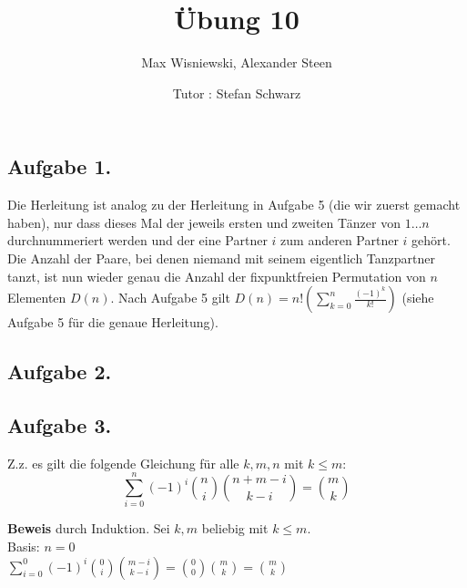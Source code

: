 \documentclass[11pt,a4paper,ngerman]{article}
\date{Tutor : Stefan Schwarz}
\title{Übung 10}
\author{Max Wisniewski, Alexander Steen}
\begin{document}

\renewcommand{\figurename}{Figure}

\maketitle
\thispagestyle{fancy}

\subsection*{Aufgabe 1.}
Die Herleitung ist analog zu der Herleitung in Aufgabe 5 (die wir zuerst gemacht haben), nur dass dieses Mal der jeweils ersten und zweiten Tänzer von $1 \ldots n$ durchnummeriert werden und der eine Partner $i$ zum anderen Partner $i$ gehört. Die Anzahl der Paare, bei denen niemand mit seinem eigentlich Tanzpartner tanzt, ist nun wieder genau die Anzahl der fixpunktfreien Permutation von $n$ Elementen $D(n)$. Nach Aufgabe 5 gilt
$D(n) = n! \left(\sum_{k=0}^n \frac{ (-1)^{k} }{k!} \right)$ (siehe Aufgabe 5 für die genaue Herleitung).
\subsection*{Aufgabe 2.}

\subsection*{Aufgabe 3.}
Z.z. es gilt die folgende Gleichung für alle $k,m,n$ mit $k \leq m$:
\begin{equation*}
  \sum_{i=0}^n (-1)^i  \binom{n}{i} \binom{n+m-i}{k-i} = \binom{m}{k}
\end{equation*}

\textbf{Beweis} durch Induktion. Sei $k,m$ beliebig mit $k \leq m$.\\
Basis: $n = 0$ \\
$\sum_{i=0}^0 (-1)^i  \binom{0}{i} \binom{m-i}{k-i} = \binom{0}{0} \binom{m}{k} = \binom{m}{k}$ \\
%
%
\end{document}
